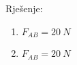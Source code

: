 


Rješenje:

\begin{enumerate}[label=\alph*)]
 \item $F_{AB}=20\ N$
 \item $F_{AB}=20\ N$
\end{enumerate}






